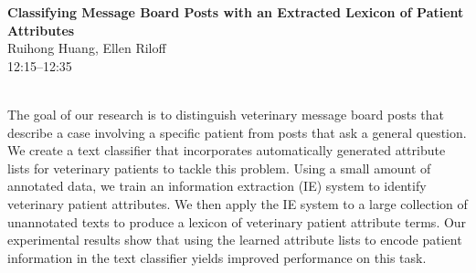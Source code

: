 \documentclass[twoside,makeidx]{book}
\begin{document}
\par\vspace{2em}\noindent%
\begin{minipage}{\linewidth}%
\begin{center}
\textbf{\normalsize Classifying Message Board Posts with an Extracted Lexicon of Patient Attributes}\\
\normalsize  Ruihong Huang,  Ellen Riloff\\
{\small 12:15--12:35}\\
\end{center}
\end{minipage}\\[0.5em]
\nopagebreak%
\noindent%
{\small The goal of our research is to distinguish veterinary message board posts that describe a case involving a specific patient from posts that ask a general question. We create a text classifier that incorporates automatically generated attribute lists for veterinary patients to tackle this problem. Using a small amount of annotated data, we train an information extraction (IE) system to identify veterinary patient attributes. We then apply the IE system to a large collection of unannotated texts to produce a lexicon of veterinary patient attribute terms. Our experimental results show that using the learned attribute lists to encode patient information in the text classifier yields improved performance on this task.}
\clearpage
\end{document}
